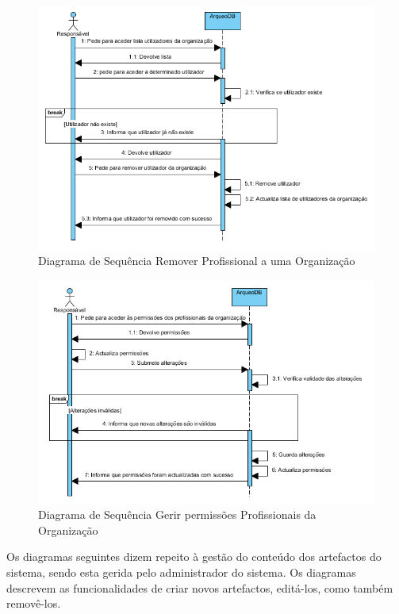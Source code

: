 ﻿\documentclass[12pt,a4paper]{article}
\begin{document}
\begin{figure}[h!]
\centering
\includegraphics[scale=1]{sequencia/removerutilizador}
\caption{Diagrama de Sequência Remover Profissional a uma Organização} 
\end{figure}  

\begin{figure}[h!]
\centering
\includegraphics[scale=1]{sequencia/P_permissoes}
\caption{Diagrama de Sequência Gerir permissões Profissionais da Organização} 
\end{figure}  

\clearpage
Os diagramas seguintes dizem repeito à gestão do conteúdo dos artefactos do sistema, sendo esta gerida pelo administrador do sistema. Os diagramas descrevem as funcionalidades de criar novos artefactos, editá-los, como também  removê-los.\\
\end{document}
